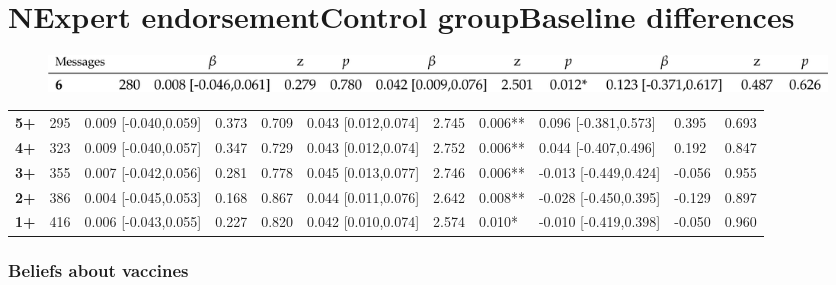 \documentclass[authordate, empirical]{jote-new-article}
\begin{document}
	\section{NExpert endorsementControl groupBaseline differences}



	\begin{figure}
		\includegraphics[width=\linewidth]{media/image2.png}

		\caption{}

		\label{fig:rId33}


	\end{figure}

	\begin{table}
		\begin{tabularx}{\linewidth}{@{} l l l l l l l l l l l @{}}
			 \textbf{5+} & 295 & 0.009 [-0.040,0.059] & 0.373 & 0.709 &
			0.043 [0.012,0.074] & 2.745 & 0.006** & 0.096 [-0.381,0.573] & 0.395 &
			0.693 \\

			 \textbf{4+} & 323 & 0.009 [-0.040,0.057] & 0.347 & 0.729 &
			0.043 [0.012,0.074] & 2.752 & 0.006** & 0.044 [-0.407,0.496] & 0.192 &
			0.847 \\

			 \textbf{3+} & 355 & 0.007 [-0.042,0.056] & 0.281 & 0.778 &
			0.045 [0.013,0.077] & 2.746 & 0.006** & -0.013 [-0.449,0.424] & -0.056 &
			0.955 \\

			 \textbf{2+} & 386 & 0.004 [-0.045,0.053] & 0.168 & 0.867 &
			0.044 [0.011,0.076] & 2.642 & 0.008** & -0.028 [-0.450,0.395] & -0.129 &
			0.897 \\

			 \textbf{1+} & 416 & 0.006 [-0.043,0.055] & 0.227 & 0.820 &
			0.042 [0.010,0.074] & 2.574 & 0.010* & -0.010 [-0.419,0.398] & -0.050 &
			0.960 \\


		\end{tabularx}
	\end{table}









	\subsubsection{Beliefs about vaccines}
\end{document}
